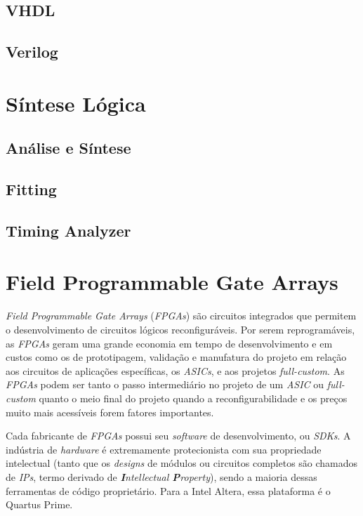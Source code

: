     \subsection{VHDL}
    {}

    \subsection{Verilog}
    {}

\section{Síntese Lógica}
{}

    \subsection{Análise e Síntese}
    {}

    \subsection{Fitting}
    {}

    \subsection{Timing Analyzer}
    {}

\section{Field Programmable Gate Arrays}
{ \textit{Field Programmable Gate Arrays} (\textit{FPGAs}) são circuitos
    integrados que permitem o desenvolvimento de circuitos lógicos
    reconfiguráveis. Por serem reprogramáveis, as \textit{FPGAs} geram uma
    grande economia em tempo de desenvolvimento e em custos como os de
    prototipagem, validação e manufatura do projeto em relação aos circuitos de
    aplicações específicas, os \textit{ASICs}, e aos projetos
    \textit{full-custom}. As \textit{FPGAs} podem ser tanto o passo
    intermediário no projeto de um \textit{ASIC} ou \textit{full-custom} quanto
    o meio final do projeto quando a reconfigurabilidade e os preços muito mais
    acessíveis forem fatores importantes.
}

{ Cada fabricante de \textit{FPGAs} possui seu \textit{software} de
    desenvolvimento, ou \textit{SDKs}. A indústria de \textit{hardware} é
    extremamente protecionista com sua propriedade intelectual (tanto que os
    \textit{designs} de módulos ou circuitos completos são chamados de \textit{IPs},
    termo derivado de \textit{\textbf{I}ntellectual \textbf{P}roperty}), sendo
    a maioria dessas ferramentas de código proprietário. Para a Intel Altera,
    essa plataforma é o Quartus Prime.
}

